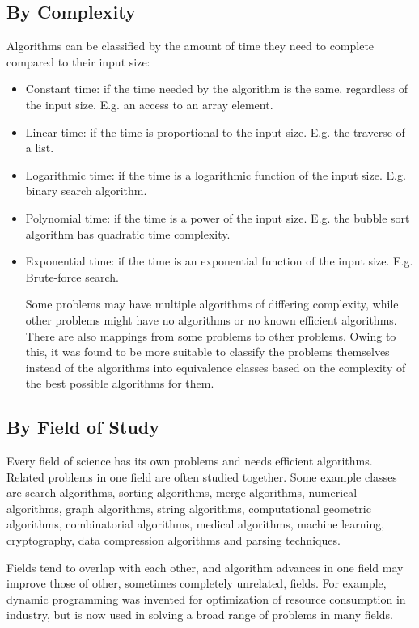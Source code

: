 \documentclass[12pt,a4paper]{book}
\begin{document}
\subsection{By Complexity}
Algorithms can be classified by the amount of time they need to complete compared to their input size:
\begin{itemize}
\item Constant time: if the time needed by the algorithm is the same, regardless of the input size. E.g. an access to an array element.
\item Linear time: if the time is proportional to the input size. E.g. the traverse of a list.
\item Logarithmic time: if the time is a logarithmic function of the input size. E.g. binary search algorithm.
\item Polynomial time: if the time is a power of the input size. E.g. the bubble sort algorithm has quadratic time complexity.
\item Exponential time: if the time is an exponential function of the input size. E.g. Brute-force search.
\par
Some problems may have multiple algorithms of differing complexity, while other problems might have no algorithms or no known efficient algorithms. There are also mappings from some problems to other problems. Owing to this, it was found to be more suitable to classify the problems themselves instead of the algorithms into equivalence classes based on the complexity of the best possible algorithms for them.
\end{itemize}
\subsection{By Field of Study}
Every field of science has its own problems and needs efficient algorithms. Related problems in one field are often studied together. Some example classes are search algorithms, sorting algorithms, merge algorithms, numerical algorithms, graph algorithms, string algorithms, computational geometric algorithms, combinatorial algorithms, medical algorithms, machine learning, cryptography, data compression algorithms and parsing techniques.
\par
Fields tend to overlap with each other, and algorithm advances in one field may improve those of other, sometimes completely unrelated, fields. For example, dynamic programming was invented for optimization of resource consumption in industry, but is now used in solving a broad range of problems in many fields.
\end{document}
